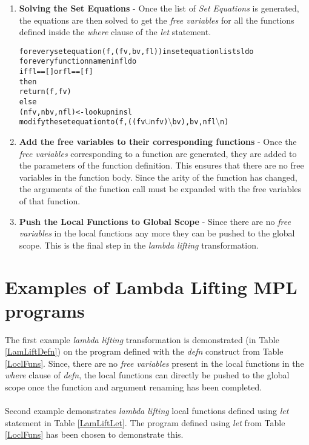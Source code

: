 \documentclass[11pt]{article}
\begin{document}
\begin{enumerate}
    \item {\bf Solving the Set Equations} - Once the list of {\em Set Equations} is generated, the equations are then solved to get the {\em free variables} for all the functions defined inside the {\em where} clause of the {\em let} statement.
    \begin{alltt}
    for every set equation (f,(fv,bv,fl)) in set equation list sl do 
        for every function name n in fl do
            if fl == [] or fl == [f] 
               then
                 return (f,fv) 
               else      
                (nfv,nbv,nfl)  <- lookup n in sl
                modify the set equation to (f,((fv \(\cup\) nfv) \(\setminus\) bv), bv, nfl \(\setminus\)n)        
    \end{alltt}
 
    \item {\bf Add the free variables to their corresponding functions} - Once the {\em free variables} corresponding to a function are generated, they are added to the parameters of the function definition. This ensures that there are no free variables in the function body. Since the arity of the function has changed, the arguments of the function call must be expanded with the free variables of that function. 

    \item {\bf Push the Local Functions to Global Scope} - Since there are no {\em free variables} in the local functions any more they can be pushed to the global scope. This is the final step in the {\em lambda lifting} transformation.
\end{enumerate}
\section {Examples of Lambda Lifting MPL programs}

The first example {\em lambda lifting} transformation is demonstrated (in Table \ref  {LamLiftDefn}) on the program defined with the {\em defn} construct from Table \ref {LoclFuns}. Since, there are no {\em free variables} present in the local functions in the  {\em where} clause of {\em defn}, the local functions can directly be pushed to the global scope once the function and argument renaming has been completed.
~~\\~~\\
Second example demonstrates {\em lambda lifting} local functions defined using {\em let} statement in Table \ref {LamLiftLet}. The program defined using {\em let} from Table \ref{LoclFuns}  has been chosen to demonstrate this.
\end{document}
